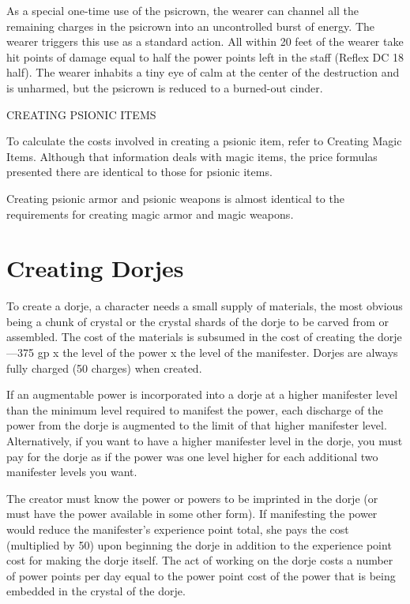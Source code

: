 \documentclass{article}
\begin{document}
As a special one-time use of the psicrown, the wearer can channel all the remaining 
charges in the psicrown into an uncontrolled burst of energy. The wearer triggers 
this use as a standard action. All within 20 feet of the wearer take hit points 
of damage equal to half the power points left in the staff (Reflex DC 18 half). 
The wearer inhabits a tiny eye of calm at the center of the destruction and is 
unharmed, but the psicrown is reduced to a burned-out cinder.

\vspace{12pt}
{\LARGE{}CREATING PSIONIC ITEMS}

To calculate the costs involved in creating a psionic item, refer to Creating Magic 
Items. Although that information deals with magic items, the price formulas presented 
there are identical to those for psionic items.

Creating psionic armor and psionic weapons is almost identical to the requirements 
for creating magic armor and magic weapons\textit{.}

\section*{\textbf{Creating Dorjes}}

To create a dorje, a character needs a small supply of materials, the most obvious 
being a chunk of crystal or the crystal shards of the dorje to be carved from or 
assembled. The cost of the materials is subsumed in the cost of creating the dorje---375 
gp x the level of the power x the level of the manifester. Dorjes are always fully 
charged (50 charges) when created.

If an augmentable power is incorporated into a dorje at a higher manifester level 
than the minimum level required to manifest the power, each discharge of the power 
from the dorje is augmented to the limit of that higher manifester level. Alternatively, 
if you want to have a higher manifester level in the dorje, you must pay for the 
dorje as if the power was one level higher for each additional two manifester levels 
you want. 

The creator must know the power or powers to be imprinted in the dorje (or must 
have the power available in some other form). If manifesting the power would reduce 
the manifester's experience point total, she pays the cost (multiplied by 50) upon 
beginning the dorje in addition to the experience point cost for making the dorje 
itself. The act of working on the dorje costs a number of power points per day 
equal to the power point cost of the power that is being embedded in the crystal 
of the dorje.
\end{document}
